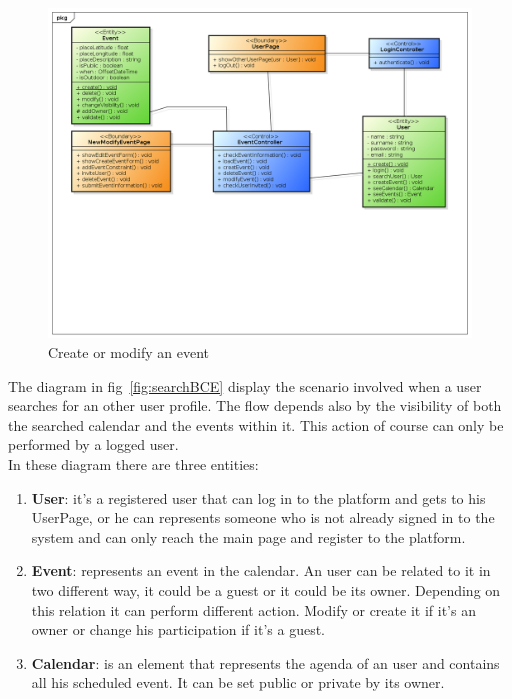 \begin{center}
 \begin{figure}[H]
    \includegraphics[width=1\textwidth]{../BCEDiagram/BCE/EntityOverview/EventManagementBCE.png}
    \caption{Create or modify an event}
     \label{fig:editneweventBCE}
     \end{figure}
   \end{center}  
The diagram in fig~\ref{fig:searchBCE} display the scenario involved when a user searches for an other user profile. The flow depends also by the visibility of both the searched calendar and the events within it. This action of course can only be performed by a logged user.\\
In these diagram there are three entities:
\begin{enumerate}
\item  {\bf User}: it's a registered user that can log in to the platform and gets to his UserPage, or he can  represents someone who is not already signed in  to the system and can only reach the main page and register to the platform.
\item  {\bf Event}: represents an event in the calendar. An user can be related to it in two different way, it could be a guest or it could be its owner. Depending on this relation it can perform different action. Modify or create it if it's an owner or change his participation if it's a guest.
\item {\bf Calendar}: is an element that represents the agenda of an user and contains all his scheduled event. It can be set public or private by its owner.
\end{enumerate}
